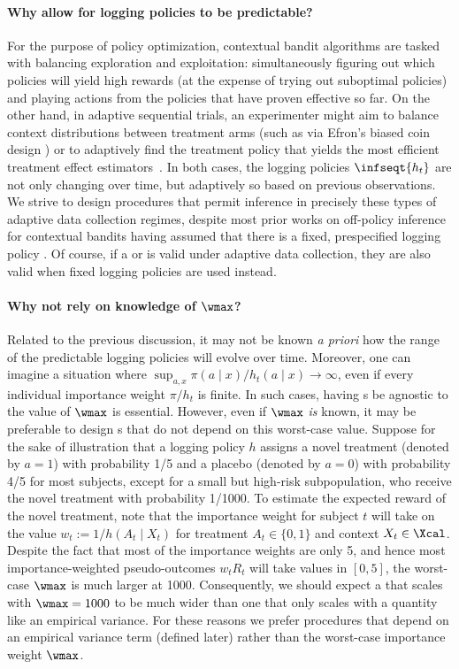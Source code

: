 \paragraph{Why allow for logging policies to be predictable?} For the purpose of policy optimization, contextual bandit algorithms are tasked with balancing exploration and exploitation: simultaneously figuring out which policies will yield high rewards (at the expense of trying out suboptimal policies) and playing actions from the policies that have proven effective so far. On the other hand, in adaptive sequential trials, an experimenter might aim to balance context distributions between treatment arms (such as via Efron's biased coin design \citep{efron1971forcing}) or to adaptively find the treatment policy that yields the most efficient treatment effect estimators~\citep{kato2020adaptive}. In both cases, the logging policies $\infseqt{h_t}$ are not only changing over time, but adaptively so based on previous observations. We strive to design procedures that permit inference in precisely these types of adaptive data collection regimes, despite most prior works on off-policy inference for contextual bandits having assumed that there is a fixed, prespecified logging policy \citep{thomas2015high,karampatziakis2021off,chandak2021universal,huang2021off}. Of course, if a \cs{} or \ci{} is valid under adaptive data collection, they are also valid when fixed logging policies are used instead.

\paragraph{Why not rely on knowledge of $\wmax$?} Related to the previous discussion, it may not be known \emph{a priori} how the range of the predictable logging policies will evolve over time. Moreover, one can imagine a situation where $\sup_{a, x} \pi(a \mid x ) / h_t(a \mid x) \to \infty$, even if every individual importance weight $\pi / h_t$ is finite. In such cases, having \cs{}s be agnostic to the value of $\wmax$ is essential. However, even if $\wmax$ \emph{is} known, it may be preferable to design \cs{}s that do not depend on this worst-case value. Suppose for the sake of illustration that a logging policy $h$ assigns a novel treatment (denoted by $a = 1$) with probability 1/5 and a placebo (denoted by $a = 0$) with probability 4/5 for most subjects, except for a small but high-risk subpopulation, who receive the novel treatment with probability 1/1000. To estimate the expected reward of the novel treatment, note that the importance weight for subject $t$ will take on the value $w_t := 1 / h(A_t \mid X_t)$ for treatment $A_t \in \{0, 1\}$ and context $X_t \in \Xcal$. Despite the fact that most of the importance weights are only 5, and hence most importance-weighted pseudo-outcomes $w_t R_t$ will take values in $[0, 5]$, the worst-case $\wmax$ is much larger at 1000. Consequently, we should expect a \cs{} that scales with $\wmax = 1000$ to be much wider than one that only scales with a quantity like an empirical variance. For these reasons we prefer procedures that depend on an empirical variance term (defined later) rather than the worst-case importance weight $\wmax$.



